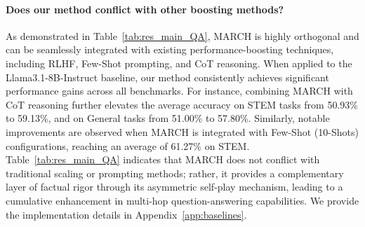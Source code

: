 \documentclass[10pt, a4paper, logo]{googledeepmind} %
\begin{document}
\paragraph{Does our method conflict with other boosting methods?}
As demonstrated in Table~\ref{tab:res_main_QA}, MARCH is highly orthogonal and can be seamlessly integrated with existing performance-boosting techniques, including RLHF, Few-Shot prompting, and CoT reasoning. When applied to the Llama3.1-8B-Instruct baseline, our method consistently achieves significant performance gains across all benchmarks. For instance, combining MARCH with CoT reasoning further elevates the average accuracy on STEM tasks from 50.93\% to 59.13\%, and on General tasks from 51.00\% to 57.80\%. Similarly, notable improvements are observed when MARCH is integrated with Few-Shot (10-Shots) configurations, reaching an average of 61.27\% on STEM. Table~\ref{tab:res_main_QA} indicates that MARCH does not conflict with traditional scaling or prompting methods; rather, it provides a complementary layer of factual rigor through its asymmetric self-play mechanism, leading to a cumulative enhancement in multi-hop question-answering capabilities. We provide the implementation details in Appendix~\ref{app:baselines}.
\end{document}
